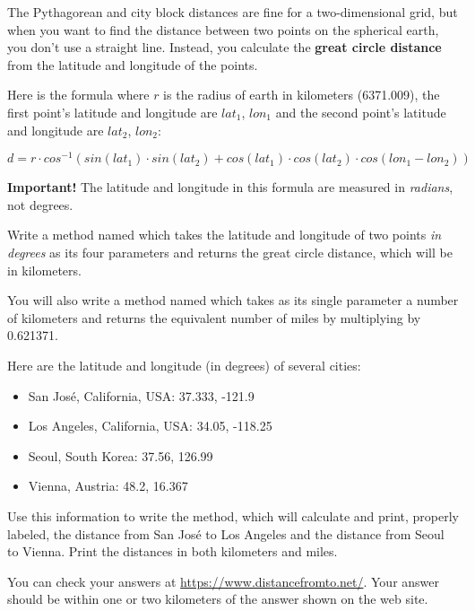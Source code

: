 \begin{exercise}
The Pythagorean and city block distances are fine for a two-dimensional grid, but when you want to find the distance between two points on the spherical earth, you don't use a straight line. Instead, you calculate the {\bf great circle distance} from the latitude and longitude of the points.

Here is the formula where $r$ is the radius of earth in kilometers (6371.009), the first point's latitude and longitude are $lat_1$, $lon_1$ and the second point's latitude and longitude are  $lat_2$, $lon_2$:

\begin{equation*}
d = r\cdot cos^{-1}(sin(lat_1)\cdot sin(lat_2) + cos(lat_1)\cdot cos(lat_2)\cdot cos(lon_1 - lon_2))
\end{equation*}

{\bf Important!} The latitude and longitude in this formula are measured in {\em radians}, not degrees.

Write a method named  which takes the latitude and longitude of two points {\em in degrees} as its four parameters and returns the great circle distance, which will be in kilometers.

You will also write a method named  which takes as its single parameter a number of kilometers and returns the equivalent number of miles by multiplying by 0.621371.

Here are the latitude and longitude (in degrees) of several cities:
\begin{itemize}
\item San Jos\'e, California, USA: 37.333, -121.9
\item Los Angeles, California, USA: 34.05, -118.25
\item Seoul, South Korea: 37.56, 126.99
\item Vienna, Austria: 48.2, 16.367
\end{itemize}

Use this information to write the  method, which will calculate and print, properly labeled, the distance from San Jos\'e to Los Angeles and the distance from Seoul to Vienna. Print the distances in both kilometers and miles.

You can check your answers at \url{https://www.distancefromto.net/}. Your answer should be within one or two kilometers of the answer shown on the web site.
\end{exercise}

